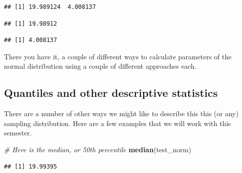 \documentclass[
]{book}
\newenvironment{Shaded}{\begin{snugshade}}{\end{snugshade}}
\newcommand{\CommentTok}[1]{\textcolor[rgb]{0.56,0.35,0.01}{\textit{#1}}}
\newcommand{\DataTypeTok}[1]{\textcolor[rgb]{0.13,0.29,0.53}{#1}}
\newcommand{\DecValTok}[1]{\textcolor[rgb]{0.00,0.00,0.81}{#1}}
\newcommand{\FloatTok}[1]{\textcolor[rgb]{0.00,0.00,0.81}{#1}}
\newcommand{\KeywordTok}[1]{\textcolor[rgb]{0.13,0.29,0.53}{\textbf{#1}}}
\newcommand{\NormalTok}[1]{#1}
\newcommand{\OperatorTok}[1]{\textcolor[rgb]{0.81,0.36,0.00}{\textbf{#1}}}
\begin{document}
\begin{verbatim}
## [1] 19.989124  4.008137
\end{verbatim}

\begin{Shaded}
\end{Shaded}

\begin{verbatim}
## [1] 19.98912
\end{verbatim}

\begin{Shaded}
\end{Shaded}

\begin{verbatim}
## [1] 4.008137
\end{verbatim}

There you have it, a couple of different ways to calculate parameters of the normal distribution using a couple of different approaches each.

\hypertarget{quantiles-and-other-descriptive-statistics}{%
\subsection{Quantiles and other descriptive statistics}\label{quantiles-and-other-descriptive-statistics}}

There are a number of other ways we might like to describe this this (or any) sampling distribution. Here are a few examples that we will work with this semester.

\begin{Shaded}
\begin{Highlighting}[]
\CommentTok{# Here is the median, or 50th percentile}
\KeywordTok{median}\NormalTok{(test_norm) }
\end{Highlighting}
\end{Shaded}

\begin{verbatim}
## [1] 19.99395
\end{verbatim}

\begin{Shaded}
\end{Shaded}
\end{document}
